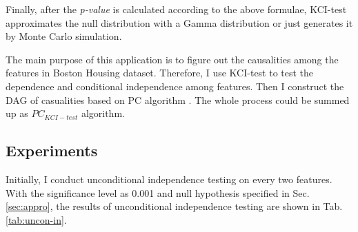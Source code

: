 \documentclass[12pt,a4paper]{article}
\theoremstyle{definition}
\begin{document}
\vspace{0.008\linewidth}
Finally, after the \textit{p-value} is calculated according to the above formulae, KCI-test approximates the null distribution with a Gamma distribution or just generates it by Monte Carlo simulation.

\vspace{0.008\linewidth}
The main purpose of this application is to figure out the causalities among the features in Boston Housing dataset. Therefore, I use KCI-test to test the dependence and conditional independence among features. Then I construct the DAG of casualities based on PC algorithm \cite{pc-alg}. The whole process could be summed up as $PC_{KCI-test}$ algorithm.

\subsection{Experiments}

Initially, I conduct unconditional independence testing on every two features. With the significance level as 0.001 and null hypothesis specified in Sec. \ref{sec:appro}, the results of unconditional independence testing are shown in Tab. \ref{tab:uncon-in}.
\end{document}
